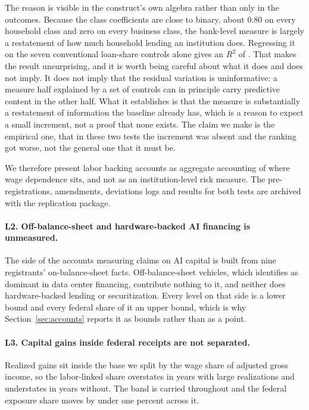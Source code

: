The reason is visible in the construct's own algebra rather than only in the outcomes. Because
the class coefficients are close to binary, about 0.80 on every household class and zero on every
business class, the bank-level measure is largely a restatement of how much household lending an
institution does. Regressing it on the seven conventional loan-share controls alone gives an
$R^2$ of . That makes the result unsurprising, and it is worth being
careful about what it does and does not imply. It does not imply that the residual variation is
uninformative: a measure half explained by a set of controls can in principle carry predictive
content in the other half. What it establishes is that the measure is substantially a restatement
of information the baseline already has, which is a reason to expect a small increment, not a
proof that none exists. The claim we make is the empirical one, that in these two tests the
increment was absent and the ranking got worse, not the general one that it must be.

We therefore present labor backing accounts as aggregate accounting of where wage dependence
sits, and not as an institution-level risk measure. The pre-registrations, amendments, deviations
logs and results for both tests are archived with the replication package.

\paragraph{L2. Off-balance-sheet and hardware-backed AI financing is unmeasured.} The side of the
accounts measuring claims on AI capital is built from nine registrants' on-balance-sheet facts.
Off-balance-sheet vehicles, which \citet{BIS2026} identifies as dominant in data center
financing, contribute nothing to it, and neither does hardware-backed lending or securitization.
Every level on that side is a lower bound and every federal share of it an upper bound, which is
why Section~\ref{sec:accounts} reports it as bounds rather than as a point.

\paragraph{L3. Capital gains inside federal receipts are not separated.} Realized gains sit
inside the base we split by the wage share of adjusted gross income, so the labor-linked share
overstates in years with large realizations and understates in years without. The band is carried
throughout and the federal exposure share moves by under one percent across it.

